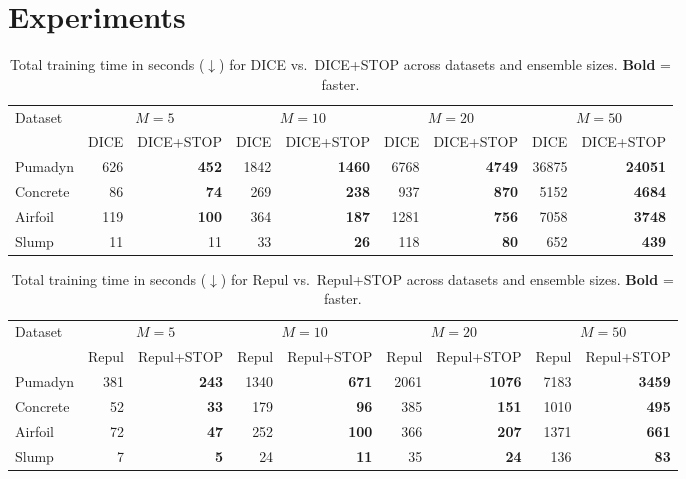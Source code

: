 \documentclass[sigconf]{acmart}
\begin{document}
\section{Experiments}
\label{sec:experiments}

\begin{table}[t]
\centering
\caption{Total training time in seconds ($\downarrow$) for DICE vs.\ DICE+STOP across datasets and ensemble sizes. \textbf{Bold} = faster.}
\label{tab:training_time_dice}
\begin{tabular}{lrrrrrrrr}
\toprule
Dataset & \multicolumn{2}{c}{$M=5$} & \multicolumn{2}{c}{$M=10$} & \multicolumn{2}{c}{$M=20$} & \multicolumn{2}{c}{$M=50$} \\
\cmidrule(lr){2-3} \cmidrule(lr){4-5} \cmidrule(lr){6-7} \cmidrule(lr){8-9}
 & DICE & DICE+STOP & DICE & DICE+STOP & DICE & DICE+STOP & DICE & DICE+STOP \\
\midrule
Pumadyn & 626 & \textbf{452} & 1842 & \textbf{1460} & 6768 & \textbf{4749} & 36875 & \textbf{24051} \\
Concrete & 86 & \textbf{74} & 269 & \textbf{238} & 937 & \textbf{870} & 5152 & \textbf{4684} \\
Airfoil & 119 & \textbf{100} & 364 & \textbf{187} & 1281 & \textbf{756} & 7058 & \textbf{3748} \\
Slump & 11 & 11 & 33 & \textbf{26} & 118 & \textbf{80} & 652 & \textbf{439} \\
\bottomrule
\end{tabular}
\end{table}

\begin{table}[t]
\centering
\caption{Total training time in seconds ($\downarrow$) for Repul vs.\ Repul+STOP across datasets and ensemble sizes. \textbf{Bold} = faster.}
\label{tab:training_time_repul}
\begin{tabular}{lrrrrrrrr}
\toprule
Dataset & \multicolumn{2}{c}{$M=5$} & \multicolumn{2}{c}{$M=10$} & \multicolumn{2}{c}{$M=20$} & \multicolumn{2}{c}{$M=50$} \\
\cmidrule(lr){2-3} \cmidrule(lr){4-5} \cmidrule(lr){6-7} \cmidrule(lr){8-9}
 & Repul & Repul+STOP & Repul & Repul+STOP & Repul & Repul+STOP & Repul & Repul+STOP \\
\midrule
Pumadyn & 381 & \textbf{243} & 1340 & \textbf{671} & 2061 & \textbf{1076} & 7183 & \textbf{3459} \\
Concrete & 52 & \textbf{33} & 179 & \textbf{96} & 385 & \textbf{151} & 1010 & \textbf{495} \\
Airfoil & 72 & \textbf{47} & 252 & \textbf{100} & 366 & \textbf{207} & 1371 & \textbf{661} \\
Slump & 7 & \textbf{5} & 24 & \textbf{11} & 35 & \textbf{24} & 136 & \textbf{83} \\
\bottomrule
\end{tabular}
\end{table}
\end{document}
